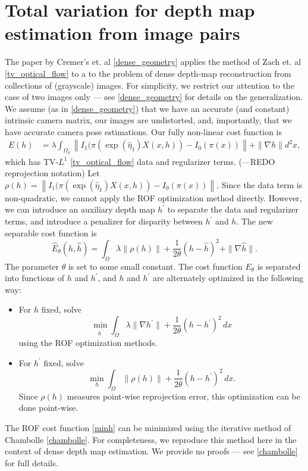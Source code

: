 \documentclass[conference]{IEEEtran}
\begin{document}
\section{Total variation for depth map estimation from image pairs}
The paper by Cremer's et. al \ref{dense_geometry} applies the method of Zach et. al \ref{tv_optical_flow} to
a to the problem of dense depth-map
reconstruction from collections of (grayscale) images. For simplicity, we restrict our attention to the case of two images only ---
see \ref{dense_geometry} for details on the generalization. We assume (as in \ref{dense_geometry}) that we have an accurate (and constant) intrinsic camera matrix,
our images are undistorted, and, importantly, that we have accurate camera pose estimations.
Our fully non-linear cost function is
\begin{equation}
\begin{split}
E(h) &= \lambda \int_{\Omega_0}\left\|I_1(\pi(\exp(\hat{\eta}_1)X(x,h)) - I_0(\pi(x))\right\|
     + \|\nabla h\| d^2 x,
\end{split}
\end{equation}
which has TV-$L^1$ \ref{tv_optical_flow} data and regularizer terms.
(---REDO reprojection notation)
Let $\rho(h) = \left\|I_1(\pi(\exp(\hat{\eta}_1)X(x,h)) - I_0(\pi(x))\right\|$. Since the data term is non-quadratic, we
cannot apply the ROF optimization method directly. However, we can introduce
an auxiliary depth map $h^\prime$ to separate the data and regularizer terms,
and introduce a penalizer for disparity between $h^\prime$ and $h$. The
new separable cost function is
\begin{equation}\label{separable_cost}
    \hat{E}_\theta(h, \hat{h}) = \int_\Omega \lambda \|\rho(h)\| + \frac{1}{2\theta}(h - \hat{h})^2 + \|\nabla \hat{h}\|.
\end{equation}
The parameter $\theta$ is set to some small constant.
The cost function $E_\theta$ is separated into functions of $h$ and $h^\prime$,
and $h$ and $h^\prime$ are alternately optimized in the following way:
\begin{itemize}
    \item For $h$ fixed, solve
        \begin{equation}\label{minh}
            \min_{h^\prime} \int_\Omega \lambda \|\nabla h^\prime\| + \frac{1}{2\theta}(h - h^\prime)^2\,dx
        \end{equation}
    using the ROF optimization methods.
    \item For $h^\prime$ fixed, solve
        \begin{equation}\label{minhhat}
            \min_h \int_\Omega \|\rho(h)\| + \frac{1}{2\theta}(h - h^\prime)^2\,dx.
        \end{equation}
        Since $\rho(h)$ measures point-wise reprojection error, this
        optimization can be done point-wise.
\end{itemize}
The ROF cost function \eqref{minh} can be minimized using the iterative method of Chambolle \ref{chambolle}. For completeness, we reproduce this
method here in the context of dense depth map estimation. We provide no proofs --- see \ref{chambolle} for full details.
\end{document}
